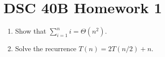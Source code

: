 \documentclass{article}
\begin{document}
\section*{DSC 40B Homework 1}
\begin{enumerate}
  \item Show that $\sum_{i=1}^{n} i = \Theta(n^2)$.
  \item Solve the recurrence $T(n) = 2T(n/2) + n$.
\end{enumerate}
\end{document}
